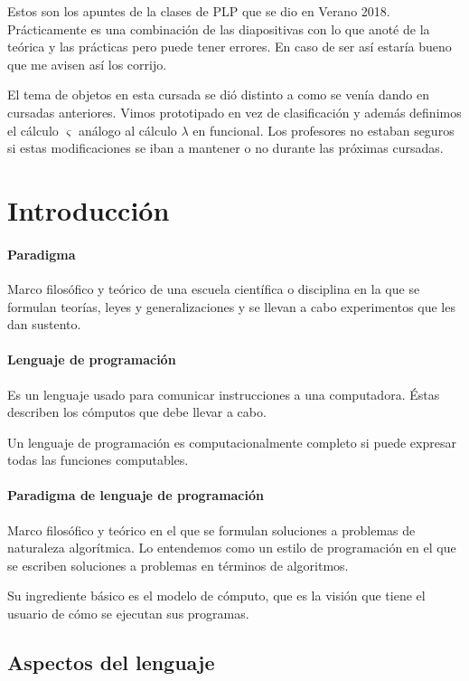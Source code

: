 Estos son los apuntes de la clases de PLP que se dio en Verano 2018. Prácticamente es una combinación de las diapositivas con lo que anoté de la teórica y las prácticas pero puede tener errores. En caso de ser así estaría bueno que me avisen así los corrijo. 

El tema de objetos en esta cursada se dió distinto a como se venía dando en cursadas anteriores. Vimos prototipado en vez de clasificación y además definimos el cálculo \(\varsigma\) análogo al cálculo \(\lambda\) en funcional. Los profesores no estaban seguros si estas modificaciones se iban a mantener o no durante las próximas cursadas.

\section{Introducción}

\paragraph{Paradigma} Marco filosófico y teórico de una escuela científica o disciplina en la que se formulan teorías, leyes y generalizaciones y se llevan a cabo experimentos que les dan sustento.

\paragraph{Lenguaje de programación} Es un lenguaje usado para comunicar instrucciones a una computadora. Éstas describen los cómputos que debe llevar a cabo.

Un lenguaje de programación es computacionalmente completo si puede expresar todas las funciones computables.

\paragraph{Paradigma de lenguaje de programación} Marco filosófico y teórico en el que se formulan soluciones a problemas de naturaleza algorítmica. Lo entendemos como un estilo de programación en el que se escriben soluciones a problemas en términos de algoritmos.

Su ingrediente básico es el modelo de cómputo, que es la visión que tiene el usuario de cómo se ejecutan sus programas.

\subsection{Aspectos del lenguaje}

